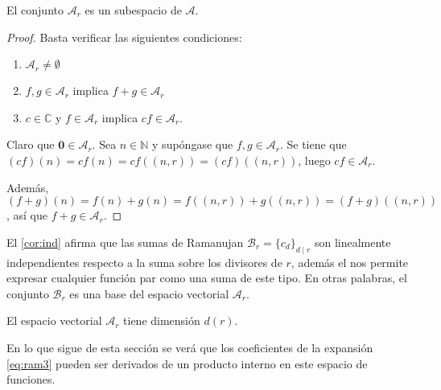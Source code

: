 \begin{proposition}
El conjunto $\mathcal{A}_r$ es un subespacio de $\mathcal{A}$.
\end{proposition}
\begin{proof}
Basta verificar las siguientes condiciones:
\begin{enumerate}[label=\textnormal{(\roman*)}]
\item $\mathcal{A}_r \ne \emptyset$
\item $f, g \in \mathcal{A}_r$ implica $f+g \in \mathcal{A}_r$
\item $c \in \mathbb{C}$ y $f \in \mathcal{A}_r$ implica $c f \in \mathcal{A}_r$.
\end{enumerate}
Claro que $\mathbf{0} \in \mathcal{A}_r$. Sea $n \in \mathbb{N}$ y supóngase que $f, g \in \mathcal{A}_r$. Se tiene que $(c f)(n) = c f(n) = c f((n,r)) = (c f)((n,r))$, luego $c f \in \mathcal{A}_r$.
\bigskip

Además, $(f+g)(n)=f(n)+g(n)=f((n,r))+g((n,r))=(f+g)((n,r))$, así que $f+g \in \mathcal{A}_r$.
\bigskip
\end{proof}

El \cref{cor:ind} afirma que las sumas de Ramanujan $\mathcal{B}_r = \{ c_d \}_{d \mid r}$ son linealmente independientes respecto a la suma sobre los divisores de $r$, además el  nos permite expresar cualquier función par como una suma de este tipo. En otras palabras, el conjunto $\mathcal{B}_r$ es una base del espacio vectorial $\mathcal{A}_r$.

\begin{corollary}
El espacio vectorial $\mathcal{A}_r$ tiene dimensión $d(r)$.
\end{corollary}

En lo que sigue de esta sección se verá que los coeficientes de la expansión \eqref{eq:ram3} pueden ser derivados de un producto interno en este espacio de funciones.

